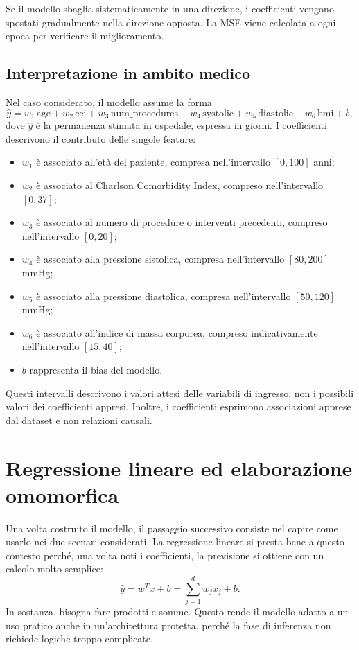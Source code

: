 Se il modello sbaglia sistematicamente in una direzione, i coefficienti vengono spostati gradualmente nella direzione opposta. La MSE viene calcolata a ogni epoca per verificare il miglioramento.

\subsection{Interpretazione in ambito medico}
Nel caso considerato, il modello assume la forma
\begin{equation}
\hat{y}=w_1\,\text{age}+w_2\,\text{cci}
+w_3\,\text{num\_procedures}+w_4\,\text{systolic}
+w_5\,\text{diastolic}+w_6\,\text{bmi}+b,
\end{equation}
dove $\hat{y}$ \`e la permanenza stimata in ospedale, espressa in giorni. I coefficienti descrivono il contributo delle singole feature:
\begin{itemize}
  \item $w_1$ \`e associato all'et\`a del paziente, compresa nell'intervallo $[0,100]$ anni;
  \item $w_2$ \`e associato al Charlson Comorbidity Index, compreso nell'intervallo $[0,37]$;
  \item $w_3$ \`e associato al numero di procedure o interventi precedenti, compreso nell'intervallo $[0,20]$;
  \item $w_4$ \`e associato alla pressione sistolica, compresa nell'intervallo $[80,200]$ mmHg;
  \item $w_5$ \`e associato alla pressione diastolica, compresa nell'intervallo $[50,120]$ mmHg;
  \item $w_6$ \`e associato all'indice di massa corporea, compreso indicativamente nell'intervallo $[15,40]$;
  \item $b$ rappresenta il bias del modello.
\end{itemize}

Questi intervalli descrivono i valori attesi delle variabili di ingresso, non i possibili valori dei coefficienti appresi. Inoltre, i coefficienti esprimono associazioni apprese dal dataset e non relazioni causali.

\section{Regressione lineare ed elaborazione omomorfica}
Una volta costruito il modello, il passaggio successivo consiste nel capire come usarlo nei due scenari considerati. La regressione lineare si presta bene a questo contesto perch\'e, una volta noti i coefficienti, la previsione si ottiene con un calcolo molto semplice:
\begin{equation}
\hat{y} = w^T x + b = \sum_{j=1}^{d} w_j x_j + b.
\end{equation}
In sostanza, bisogna fare prodotti e somme. Questo rende il modello adatto a un uso pratico anche in un'architettura protetta, perch\'e la fase di inferenza non richiede logiche troppo complicate.

